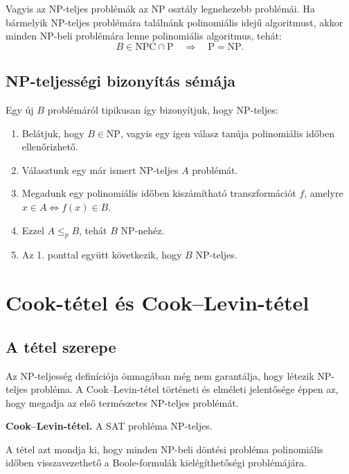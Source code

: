 Vagyis az NP-teljes problémák az $\mathrm{NP}$ osztály legnehezebb problémái. Ha bármelyik NP-teljes problémára találnánk polinomiális idejű algoritmust, akkor minden $\mathrm{NP}$-beli problémára lenne polinomiális algoritmus, tehát:
\[
  B\in\mathrm{NPC}\cap\mathrm{P}
  \quad\Longrightarrow\quad
  \mathrm{P}=\mathrm{NP}.
\]

\subsection{NP-teljességi bizonyítás sémája}

Egy új $B$ problémáról tipikusan így bizonyítjuk, hogy NP-teljes:

\begin{enumerate}
  \item Belátjuk, hogy $B\in\mathrm{NP}$, vagyis egy igen válasz tanúja polinomiális időben ellenőrizhető.
  \item Választunk egy már ismert NP-teljes $A$ problémát.
  \item Megadunk egy polinomiális időben kiszámítható transzformációt $f$, amelyre $x\in A\Longleftrightarrow f(x)\in B$.
  \item Ezzel $A\leq_p B$, tehát $B$ NP-nehéz.
  \item Az 1. ponttal együtt következik, hogy $B$ NP-teljes.
\end{enumerate}



\section{Cook-tétel és Cook--Levin-tétel}

\subsection{A tétel szerepe}

Az NP-teljesség definíciója önmagában még nem garantálja, hogy létezik NP-teljes probléma. A Cook--Levin-tétel történeti és elméleti jelentősége éppen az, hogy megadja az első természetes NP-teljes problémát.

\begin{summarybox}
\textbf{Cook--Levin-tétel.} A SAT probléma NP-teljes.
\end{summarybox}

A tétel azt mondja ki, hogy minden $\mathrm{NP}$-beli döntési probléma polinomiális időben visszavezethető a Boole-formulák kielégíthetőségi problémájára.

